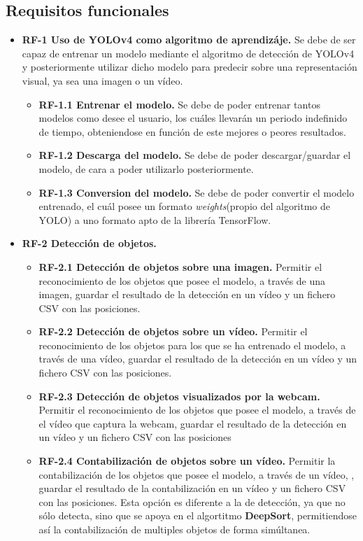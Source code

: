 \subsection{Requisitos funcionales}
\begin{itemize}
    \tightlist
    \item \textbf{RF-1 Uso de YOLOv4 como algoritmo de aprendizáje.} Se debe de ser capaz de entrenar un modelo mediante el algoritmo de detección de YOLOv4 y posteriormente utilizar dicho modelo para predecir sobre una representación visual, ya sea una imagen o un vídeo.
    \begin{itemize}
    \tightlist
    \item \textbf{RF-1.1 Entrenar el modelo.} Se debe de poder entrenar tantos modelos como desee el usuario, los cuáles llevarán un periodo indefinido de tiempo, obteniendose en función de este mejores o peores resultados.
    \item \textbf{RF-1.2 Descarga del modelo.} Se debe de poder descargar/guardar el modelo, de cara a poder utilizarlo posteriormente.
    \item \textbf{RF-1.3 Conversion del modelo.} Se debe de poder convertir el modelo entrenado, el cuál posee un formato \textit{weights}(propio del algoritmo de YOLO) a uno formato apto de la librería TensorFlow.
    \end{itemize}
    \item \textbf{RF-2 Detección de objetos.}
    \begin{itemize}
      \tightlist
      \item \textbf{RF-2.1 Detección de objetos sobre una imagen.} Permitir el reconocimiento de los objetos que posee el modelo, a través de una imagen, guardar el resultado de la detección en un vídeo y un fichero CSV con las posiciones.
      \item \textbf{RF-2.2 Detección de objetos sobre un vídeo.} Permitir el reconocimiento de los objetos para los que se ha entrenado el modelo, a través de una vídeo, guardar el resultado de la detección en un vídeo y un fichero CSV con las posiciones.
      \item \textbf{RF-2.3 Detección de objetos visualizados por la webcam.} Permitir el reconocimiento de los objetos que posee el modelo, a través de el vídeo que captura la webcam, guardar el resultado de la detección en un vídeo y un fichero CSV con las posiciones
      \item \textbf{RF-2.4 Contabilización de objetos sobre un vídeo.} Permitir la contabilización de los objetos que posee el modelo, a través de un vídeo, , guardar el resultado de la contabilización en un vídeo y un fichero CSV con las posiciones. Esta opción es diferente a la de detección, ya que no sólo detecta, sino que se apoya en el algortitmo \textbf{DeepSort}\cite{deepsort}, permitiendose así la contabilización de multiples objetos de forma simúltanea.

\end{itemize}
\end{itemize}

